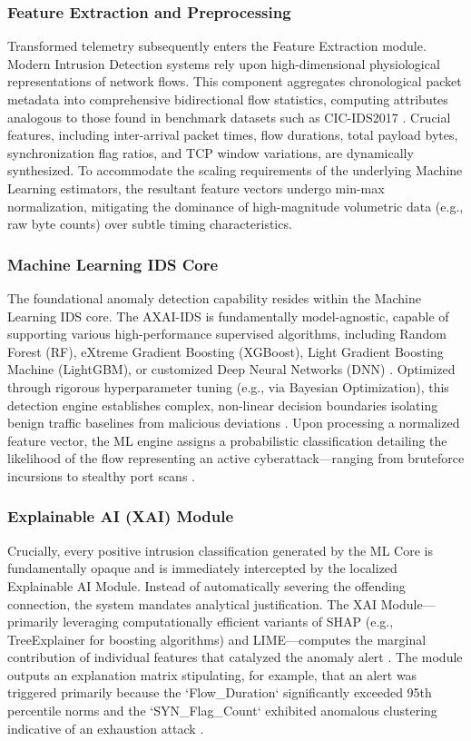 \documentclass[conference]{IEEEtran}
\begin{document}
\subsubsection{Feature Extraction and Preprocessing}
Transformed telemetry subsequently enters the Feature Extraction module. Modern Intrusion Detection systems rely upon high-dimensional physiological representations of network flows. This component aggregates chronological packet metadata into comprehensive bidirectional flow statistics, computing attributes analogous to those found in benchmark datasets such as CIC-IDS2017 \cite{ahmad2020network}. Crucial features, including inter-arrival packet times, flow durations, total payload bytes, synchronization flag ratios, and TCP window variations, are dynamically synthesized. To accommodate the scaling requirements of the underlying Machine Learning estimators, the resultant feature vectors undergo min-max normalization, mitigating the dominance of high-magnitude volumetric data (e.g., raw byte counts) over subtle timing characteristics.

\subsubsection{Machine Learning IDS Core}
The foundational anomaly detection capability resides within the Machine Learning IDS core. The AXAI-IDS is fundamentally model-agnostic, capable of supporting various high-performance supervised algorithms, including Random Forest (RF), eXtreme Gradient Boosting (XGBoost), Light Gradient Boosting Machine (LightGBM), or customized Deep Neural Networks (DNN) \cite{wang2021explainable}. Optimized through rigorous hyperparameter tuning (e.g., via Bayesian Optimization), this detection engine establishes complex, non-linear decision boundaries isolating benign traffic baselines from malicious deviations \cite{lundberg2017unified}. Upon processing a normalized feature vector, the ML engine assigns a probabilistic classification detailing the likelihood of the flow representing an active cyberattack—ranging from bruteforce incursions to stealthy port scans \cite{ribeiro2016should}. 

\subsubsection{Explainable AI (XAI) Module}
Crucially, every positive intrusion classification generated by the ML Core is fundamentally opaque and is immediately intercepted by the localized Explainable AI Module. Instead of automatically severing the offending connection, the system mandates analytical justification. The XAI Module—primarily leveraging computationally efficient variants of SHAP (e.g., TreeExplainer for boosting algorithms) and LIME—computes the marginal contribution of individual features that catalyzed the anomaly alert \cite{stafford2020zero}. The module outputs an explanation matrix stipulating, for example, that an alert was triggered primarily because the `Flow\_Duration` significantly exceeded 95th percentile norms and the `SYN\_Flag\_Count` exhibited anomalous clustering indicative of an exhaustion attack \cite{sharafaldin2018toward, moustafa2015unsw}. 
\end{document}
